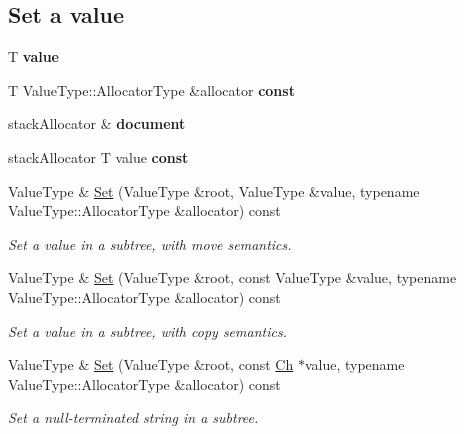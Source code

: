 \subsection*{Set a value}
\begin{DoxyCompactItemize}
\item 
\mbox{\label{classGenericPointer_a08ef35da0ea9a51d8265a360f0c34540}} 
T {\bfseries value}
\item 
T Value\+Type\+::\+Allocator\+Type \&allocator {\bfseries const}
\item 
\mbox{\label{classGenericPointer_afd073c4e3be53fd7ec08aec9f75fbaa9}} 
stack\+Allocator \& {\bfseries document}
\item 
stack\+Allocator T value {\bfseries const}
\item 
Value\+Type \& \hyperlink{classGenericPointer_a71476d125a276b62a246990da1bd3468}{Set} (Value\+Type \&root, Value\+Type \&value, typename Value\+Type\+::\+Allocator\+Type \&allocator) const
\begin{DoxyCompactList}\small\item\em Set a value in a subtree, with move semantics. \end{DoxyCompactList}\item 
\mbox{\label{classGenericPointer_a61c0e9695cb0c96d465c8e1c21bd48fa}} 
Value\+Type \& \hyperlink{classGenericPointer_a61c0e9695cb0c96d465c8e1c21bd48fa}{Set} (Value\+Type \&root, const Value\+Type \&value, typename Value\+Type\+::\+Allocator\+Type \&allocator) const
\begin{DoxyCompactList}\small\item\em Set a value in a subtree, with copy semantics. \end{DoxyCompactList}\item 
\mbox{\label{classGenericPointer_a37ea2d2b205d3642d1e615b8b866666b}} 
Value\+Type \& \hyperlink{classGenericPointer_a37ea2d2b205d3642d1e615b8b866666b}{Set} (Value\+Type \&root, const \hyperlink{classGenericPointer_ab292356c11b4015c98d21b966b11f285}{Ch} $\ast$value, typename Value\+Type\+::\+Allocator\+Type \&allocator) const
\begin{DoxyCompactList}\small\item\em Set a null-\/terminated string in a subtree. \end{DoxyCompactList}\item 

\end{DoxyCompactItemize}
